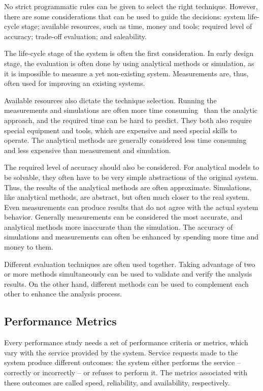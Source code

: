 No strict programmatic rules can be given to select the right technique. However, there are some considerations that can be used to guide the decisions: system life-cycle stage; available resources, such as time, money and tools; required level of accuracy; trade-off evaluation; and saleability.~\cite{jain:1991:AOCSPA}

The life-cycle stage of the system is often the first consideration. In early design stage, the evaluation is often done by using analytical methods or simulation, as it is impossible to measure a yet non-existing system. Measurements are, thus, often used for improving an existing systems.~\cite{jain:1991:AOCSPA}

Available resources also dictate the technique selection. Running the measurements and simulations are often more time consuming~\cite{Fujimoto:1990:PDE} than the analytic approach, and the required time can be hard to predict. They both also require special equipment and tools, which are expensive and need special skills to operate. The analytical methods are generally considered less time consuming and less expensive than measurement and simulation.~\cite{jain:1991:AOCSPA}


The required level of accuracy should also be considered. For analytical models to be solvable, they often have to be very simple abstractions of the original system. Thus, the results of the analytical methods are often approximate. Simulations, like analytical methods, are abstract, but often much closer to the real system. Even measurements can produce results that do not agree with the actual system behavior. Generally measurements can be considered the most accurate, and analytical methods more inaccurate than the simulation. The accuracy of simulations and measurements can often be enhanced by spending more time and money to them.~\cite{jain:1991:AOCSPA}

Different evaluation techniques are often used together. Taking advantage of two or more methods simultaneously can be used to validate and verify the analysis results. On the other hand, different methods can be used to complement each other to enhance the analysis process.~\cite{jain:1991:AOCSPA}


\subsection{Performance Metrics}
Every performance study needs a set of performance criteria or metrics, which vary with the service provided by the system. Service requests made to the system produce different outcomes: the system either performs the service -- correctly or incorrectly -- or refuses to perform it. The metrics associated with these outcomes are called speed, reliability, and availability, respectively.~\cite{jain:1991:AOCSPA}

